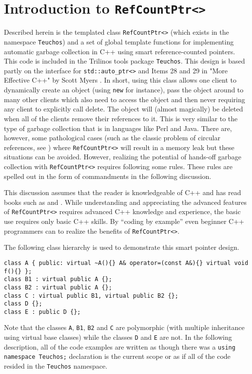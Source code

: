 %
\section{Introduction to {}\texttt{RefCountPtr<>}}
\label{rcp:sec:intro}
%

Described herein is the templated class {}\texttt{RefCountPtr<>}
(which exists in the namespace {}\texttt{Teuchos}) and a set of global
template functions for implementing automatic garbage collection in
C++ using smart reference-counted pointers.  This code is included in
the Trilinos {}\cite{ref:Trilinos-Overview} tools package
{}\texttt{Teuchos}.  This design is based partly on the interface for
{}\texttt{std::auto\_ptr<>} and Items 28 and 29 in "More Effective
C++" by Scott Myers {}\cite{ref:meyers_1996}.  In short, using this
class allows one client to dynamically create an object (using
{}\texttt{new} for instance), pass the object around to many other
clients which also need to access the object and then never requiring
any client to explicitly call delete.  The object will (almost
magically) be deleted when all of the clients remove their references
to it.  This is very similar to the type of garbage collection that
is in languages like Perl and Java.  There are, however, some
pathological cases (such as the classic problem of circular
references, see {}\cite[Item 29, page 212]{ref:meyers_1996}) where
{}\texttt{RefCountPtr<>} will result in a memory leak but these
situations can be avoided.  However, realizing the potential of
hands-off garbage collection with {}\texttt{RefCountPtr<>} requires
following some rules.  These rules are spelled out in the form of
commandments in the following discussion.

This discussion assumes that the reader is knowledgeable of C++ and
has read books such as {}\cite{ref:stroustrup_2000} and
{}\cite{ref:meyers_1994}.  While understanding and appreciating the
advanced features of {}\texttt{RefCountPtr<>} requires advanced C++
knowledge and experience, the basic use requires only basic C++
skills.  By ``coding by example'' even beginner C++ programmers can to
realize the benefits of {}\texttt{RefCountPtr<>}.

The following class hierarchy is used to demonstrate this smart
pointer design.

{\scriptsize\begin{verbatim}
class A { public: virtual ~A(){} A& operator=(const A&){} virtual void f(){} };
class B1 : virtual public A {};
class B2 : virtual public A {};
class C : virtual public B1, virtual public B2 {};
class D {};
class E : public D {};
\end{verbatim}

}Note that the classes {}\texttt{A}, {}\texttt{B1}, {}\texttt{B2} and
{}\texttt{C} are polymorphic (with multiple inheritance using virtual
base classes) while the classes {}\texttt{D} and {}\texttt{E} are not.
In the following description, all of the code examples are written as
though there was a {}\texttt{using namespace Teuchos;} declaration is
the current scope or as if all of the code resided in the
{}\texttt{Teuchos} namespace.

